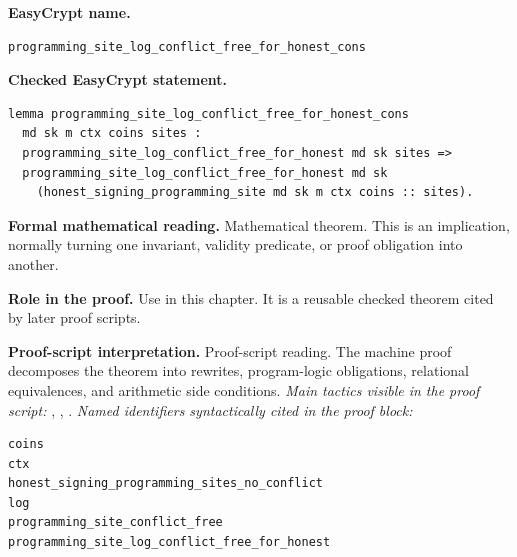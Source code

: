 \begin{formaltheorem}
\noindent\textbf{EasyCrypt name.}
\begin{lstlisting}[language=EasyCrypt,basicstyle=\ttfamily\scriptsize]
programming_site_log_conflict_free_for_honest_cons
\end{lstlisting}
\noindent\textbf{Checked EasyCrypt statement.}
\begin{lstlisting}[language=EasyCrypt,basicstyle=\ttfamily\scriptsize]
lemma programming_site_log_conflict_free_for_honest_cons
  md sk m ctx coins sites :
  programming_site_log_conflict_free_for_honest md sk sites =>
  programming_site_log_conflict_free_for_honest md sk
    (honest_signing_programming_site md sk m ctx coins :: sites).
\end{lstlisting}
\noindent\textbf{Formal mathematical reading.}
Mathematical theorem. This is an implication, normally turning one invariant, validity predicate, or proof obligation into another.

\noindent\textbf{Role in the proof.}
Use in this chapter. It is a reusable checked theorem cited by later proof scripts.

\noindent\textbf{Proof-script interpretation.}
Proof-script reading. The machine proof decomposes the theorem into rewrites, program-logic obligations, relational equivalences, and arithmetic side conditions.
\emph{Main tactics visible in the proof script:} , , .
\emph{Named identifiers syntactically cited in the proof block:}
\begin{lstlisting}[language=EasyCrypt,basicstyle=\ttfamily\scriptsize]
coins
ctx
honest_signing_programming_sites_no_conflict
log
programming_site_conflict_free
programming_site_log_conflict_free_for_honest
\end{lstlisting}

\end{formaltheorem}

